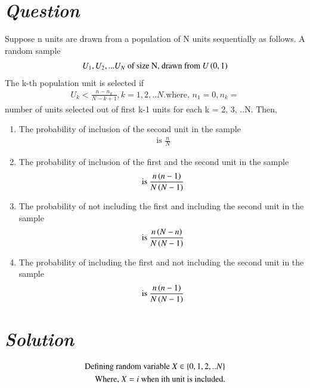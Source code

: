 \documentclass[journal,12pt,twocolumn]{IEEEtran}
\begin{document}
\section*{\emph{Question}}
Suppose n units are drawn from a population of N units sequentially as follows. A random sample
\begin{align}
    U_1, U_2, ... U_N \text{ of size N, drawn from }U\left(0, 1\right) 
\end{align} 
The k-th population unit is selected if 
\begin{align}
    U_k<\frac{n - n_k}{N-k+1}, k = 1, 2, ..N. \text{where, } n_1=0, n_k = 
\end{align}
number of units selected out of first k-1 units for each k = 2, 3, ..N. Then,
\begin{enumerate}
    \item The probability of inclusion of the second unit in the sample
    \begin{align}
        \text{ is } \frac{n}{N}
    \end{align}
    \item The probability of inclusion of the first and the second unit in the sample
    \begin{align}
        \text{ is } \frac{n \left(n-1\right)}{N \left(N-1\right)}
    \end{align}
    \item The probability of not including the first and including the second unit in the sample
    \begin{align}
        \text{ is } \frac{n \left(N-n\right)}{N \left(N-1\right)}
    \end{align}
    \item The probability of including the first and not including the second unit in the sample
    \begin{align}
        \text{ is } \frac{n \left(n-1\right)}{N \left(N-1\right)}
    \end{align}
\end{enumerate}
\section*{\emph{Solution}}
\begin{align}
\text{Defining random variable }X\in\left\{0, 1, 2, ..N\right\}
\\\text{Where, } X = i \text{ when ith unit is included.}
\end{align}
\end{document}
